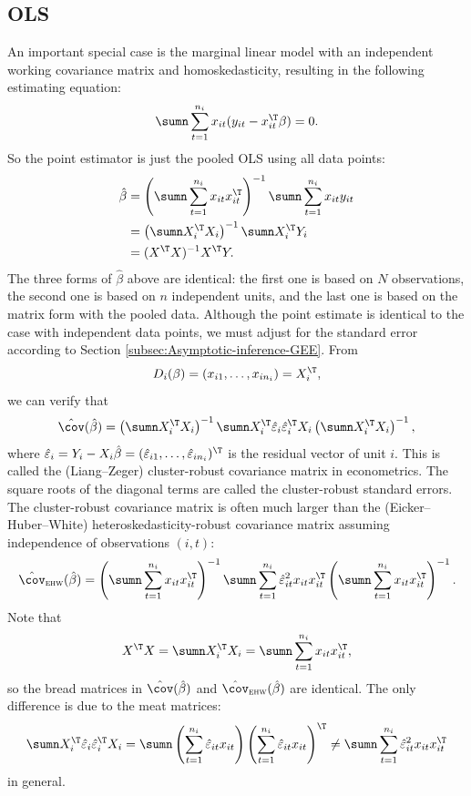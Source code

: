 \subsection{OLS}\label{sec::crse-ols}

An important special case is the
marginal linear model with an independent working covariance matrix
and homoskedasticity, resulting in the following estimating equation:
\[
\sumn\sum_{t=1}^{n_{i}}x_{it}(y_{it}-x_{it}^{\T}\beta)=0.
\]
So the point estimator is just the pooled OLS using all data
points:
\begin{align*}
\hat{\beta} & =\left(\sumn\sum_{t=1}^{n_{i}}x_{it}x_{it}^{\T}\right)^{-1}\sumn\sum_{t=1}^{n_{i}}x_{it}y_{it}\\
 & =\left(\sumn X_{i}^{\T}X_{i}\right)^{-1}\sumn X_{i}^{\T}Y_{i} \\
 &= (X^{\T} X)^{-1} X^{\T} Y.
\end{align*}
The three forms of $\hat{\beta} $ above are identical: the first one is based on $N$ observations, the second one is based on $n$ independent units, and the last one is based on the matrix form with the pooled data. 
Although the point estimate is identical to the case with independent
data points, we must adjust for the standard error according to Section
\ref{subsec:Asymptotic-inference-GEE}. From
$$
D_i(\beta) = ( x_{i1}, \ldots, x_{in_i} ) = X_i^{\T},
$$
we can verify that
\[
\hat{\cov}(\hat{\beta})=\left(\sumn X_{i}^{\T}X_{i}\right)^{-1}\sumn X_{i}^{\T}\hat{\varepsilon}_{i}\hat{\varepsilon}_{i}^{\T}X_{i}\left(\sumn X_{i}^{\T}X_{i}\right)^{-1},
\]
where $\hat{\varepsilon}_{i}=Y_{i}-X_{i}\hat{\beta}=(\hat{\varepsilon}_{i1},\ldots,\hat{\varepsilon}_{in_{i}})^{\T}$
is the residual vector of unit $i$. This is called the (Liang--Zeger) cluster-robust
covariance matrix in econometrics. The square roots of the diagonal terms are called the cluster-robust standard errors. 
The cluster-robust
covariance matrix is often much larger than the
(Eicker--Huber--White) heteroskedasticity-robust covariance matrix assuming
independence of observations $(i,t)$:
\[
\hat{\cov}_{\textsc{ehw}}(\hat{\beta})=\left(\sumn\sum_{t=1}^{n_{i}}x_{it}x_{it}^{\T}\right)^{-1}\sumn\sum_{t=1}^{n_{i}}\hat{\varepsilon}_{it}^{2}x_{it}x_{it}^{\T}\left(\sumn\sum_{t=1}^{n_{i}}x_{it}x_{it}^{\T}\right)^{-1}.
\]
Note that 
$$
X^{\T} X = \sumn X_{i}^{\T}X_{i} = \sumn\sum_{t=1}^{n_{i}}x_{it}x_{it}^{\T},
$$ 
so the bread matrices in $\hat{\cov}(\hat{\beta})$ and $\hat{\cov}_{\textsc{ehw}}(\hat{\beta})$ are identical. The only difference is due to the meat matrices:
$$
\sumn X_{i}^{\T}\hat{\varepsilon}_{i}\hat{\varepsilon}_{i}^{\T}X_{i}
= \sumn  \left( \sum_{t=1}^{n_{i}}\hat{\varepsilon}_{it} x_{it}\right) \left( \sum_{t=1}^{n_{i}}\hat{\varepsilon}_{it} x_{it} \right)^{\T}
\neq \sumn\sum_{t=1}^{n_{i}}\hat{\varepsilon}_{it}^{2}x_{it}x_{it}^{\T}
$$
in general. 


